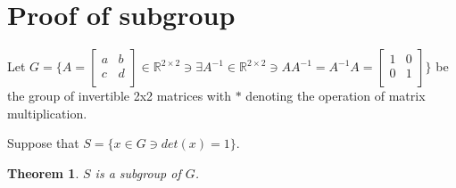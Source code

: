 \documentclass[12pt]{article}
\newcommand{\reals}{\mathbb{R}}
\newtheorem{thm}{Theorem}
\begin{document}
\section{Proof of subgroup}

Let $G = \{A = \begin{bmatrix} a & b \\ c & d \\ \end{bmatrix} \in \reals^{2 \times 2} \ni \exists A^{-1} \in \reals^{2 \times 2} \ni AA^{-1} = A^{-1}A = \begin{bmatrix} 1 & 0 \\ 0 & 1 \\ \end{bmatrix} \}$ be the group of invertible 2x2 matrices with $*$ denoting the operation of matrix multiplication.

Suppose that $S = \{ x \in G \ni det(x) = 1 \}$.

\begin{thm} \label{thm:13}
	$S$ is a subgroup of $G$.
\end{thm}
\end{document}
